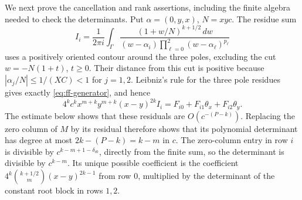 \documentclass[12pt]{article}
\numberwithin{equation}{section}
\begin{document}
We next prove the cancellation and rank assertions, including the
finite algebra needed to check the determinants. Put
$\alpha=(0,y,x)$, $N=xyc$. The residue sum
\begin{equation}\label{eq:ff-residue}
 I_i=\frac1{2\pi i}\int_\Gamma
 \frac{(1+w/N)^{k+1/2}\,dw}
 {(w-\alpha_i)\prod_{\ell=0}^2(w-\alpha_\ell)^{p_\ell}}
\end{equation}
uses a positively oriented contour around the three poles, excluding
the cut $w=-N(1+t)$, $t\ge0$. Their distance from this cut is positive
because $|\alpha_j/N|\le1/(XC)<1$ for $j=1,2$.
Leibniz's rule for the three pole residues gives exactly
\eqref{eq:ff-generator}, and hence
\[
 4^k c^k x^{m+k}y^{m+k}(x-y)^{2k} I_i
 =F_{i0}+F_{i1}\theta_x+F_{i2}\theta_y.
\]
The estimate below shows that these residuals are $O(c^{-(P-k)})$.
Replacing the zero column of $M$ by its residual therefore shows
that its polynomial determinant has degree at most
$2k-(P-k)=k-m$ in $c$. The zero-column entry in row $i$ is divisible
by $c^{k-m+1-\delta_{i0}}$, directly from the finite sum, so
the determinant is divisible by $c^{k-m}$. Its unique possible
coefficient is the coefficient $4^k\binom{k+1/2}{m}(x-y)^{2k-1}$
from row $0$, multiplied by the determinant of the constant root
block in rows $1,2$.
\end{document}
